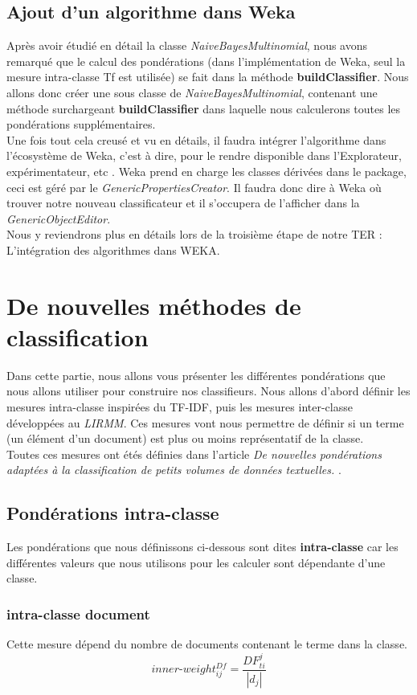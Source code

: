 \documentclass{article}
\begin{document}
\subsection{Ajout d'un algorithme dans Weka}\label{sec:algoW}
Après avoir étudié en détail la classe \textit{NaiveBayesMultinomial}, nous avons remarqué que le calcul des pondérations (dans l'implémentation de Weka, seul la mesure intra-classe Tf est utilisée) se fait dans la méthode \textbf{buildClassifier}. Nous allons donc créer une sous classe de \textit{NaiveBayesMultinomial}, contenant une méthode surchargeant \textbf{buildClassifier} dans laquelle nous calculerons toutes les pondérations supplémentaires.\\
Une fois tout cela creusé et vu en détails, il faudra intégrer l'algorithme dans l'écosystème de Weka, c'est à dire, pour le rendre disponible dans l'Explorateur, expérimentateur, etc . 
Weka prend en charge les classes dérivées dans le package, ceci est géré par le \textit{GenericPropertiesCreator}. Il faudra donc dire à Weka où trouver notre nouveau classificateur et il s'occupera de l'afficher dans la \textit{GenericObjectEditor}.\\
Nous y reviendrons plus en détails lors de la troisième étape de notre TER : L'intégration des algorithmes dans WEKA.
\section{De nouvelles méthodes de classification}
Dans cette partie, nous allons vous présenter les différentes pondérations que nous allons utiliser pour construire nos classifieurs.
Nous allons d'abord définir les mesures intra-classe inspirées du TF-IDF, puis les mesures inter-classe développées au \textit{LIRMM}.
Ces mesures vont nous permettre de définir si un terme (un élément d'un document) est plus ou moins représentatif de la classe.\\Toutes ces mesures ont étés définies dans l'article \textit{De nouvelles pondérations adaptées à la classification de petits volumes de données textuelles. }\cite{RNTIB}.
\subsection{Pondérations intra-classe}
Les pondérations que nous définissons ci-dessous sont dites \textbf{intra-classe} car les différentes valeurs que nous utilisons pour les
calculer sont dépendante d'une classe.
\subsubsection*{intra-classe document}
Cette mesure dépend du nombre de documents contenant le terme dans la classe.
  \[ inner\mbox{-}weight_{ij}^{Df} = \frac{DF_{ti}^j}{|d_{j}|}\]
  
\end{document}
